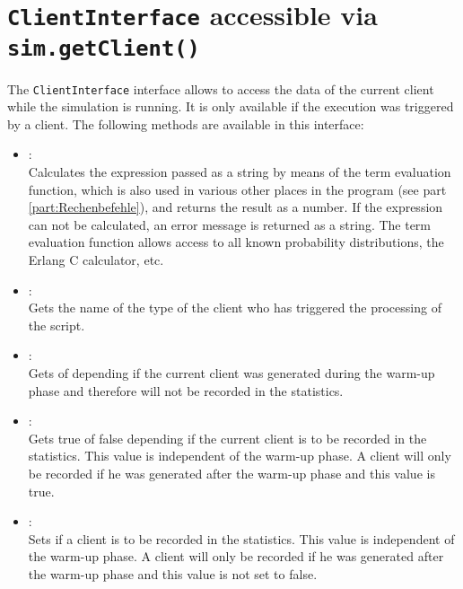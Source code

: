 \chapter{\texttt{ClientInterface} accessible via \texttt{sim.getClient()}}

The \texttt{ClientInterface} interface allows to access the data of the current
client while the simulation is running. It is only available if the execution
was triggered by a client. The following methods are available in this interface:

\begin{itemize}

\item
{}:\\
Calculates the expression passed as a string by means of the term evaluation function,
which is also used in various other places in the program (see part \ref{part:Rechenbefehle}), and returns the result as a  number.
If the expression can not be calculated, an error message is returned as a string.
The term evaluation function allows access to all known probability distributions,
the Erlang C calculator, etc.

\item
{}:\\
Gets the name of the type of the client who has triggered the processing of the script.
  
\item
{}:\\
Gets  of  depending if the current client was generated during the warm-up phase and
therefore will not be recorded in the statistics.
  
\item
{}:\\
Gets true of false depending if the current client is to be recorded in the statistics.
This value is independent of the warm-up phase. A client will only be recorded if he was
generated after the warm-up phase and this value is true.
  
\item
{}:\\
Sets if a client is to be recorded in the statistics.
This value is independent of the warm-up phase. A client will only be recorded if he was
generated after the warm-up phase and this value is not set to false.
  

\end{itemize}
